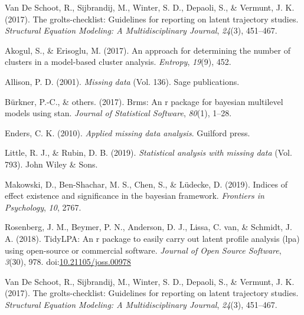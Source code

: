 \documentclass[man]{apa6}
\begin{document}
\leavevmode\hypertarget{ref-van2017grolts}{}%
Van De Schoot, R., Sijbrandij, M., Winter, S. D., Depaoli, S., \& Vermunt, J. K. (2017). The grolts-checklist: Guidelines for reporting on latent trajectory studies. \emph{Structural Equation Modeling: A Multidisciplinary Journal}, \emph{24}(3), 451--467.

\leavevmode\hypertarget{ref-akogul2017approach}{}%
Akogul, S., \& Erisoglu, M. (2017). An approach for determining the number of clusters in a model-based cluster analysis. \emph{Entropy}, \emph{19}(9), 452.

\leavevmode\hypertarget{ref-allison2001missing}{}%
Allison, P. D. (2001). \emph{Missing data} (Vol. 136). Sage publications.

\leavevmode\hypertarget{ref-burkner2017}{}%
Bürkner, P.-C., \& others. (2017). Brms: An r package for bayesian multilevel models using stan. \emph{Journal of Statistical Software}, \emph{80}(1), 1--28.

\leavevmode\hypertarget{ref-enders2010applied}{}%
Enders, C. K. (2010). \emph{Applied missing data analysis}. Guilford press.

\leavevmode\hypertarget{ref-little2019statistical}{}%
Little, R. J., \& Rubin, D. B. (2019). \emph{Statistical analysis with missing data} (Vol. 793). John Wiley \& Sons.

\leavevmode\hypertarget{ref-makowski2019}{}%
Makowski, D., Ben-Shachar, M. S., Chen, S., \& Lüdecke, D. (2019). Indices of effect existence and significance in the bayesian framework. \emph{Frontiers in Psychology}, \emph{10}, 2767.

\leavevmode\hypertarget{ref-R-tidyLPA}{}%
Rosenberg, J. M., Beymer, P. N., Anderson, D. J., Lissa, C. van, \& Schmidt, J. A. (2018). TidyLPA: An r package to easily carry out latent profile analysis (lpa) using open-source or commercial software. \emph{Journal of Open Source Software}, \emph{3}(30), 978. doi:\href{https://doi.org/10.21105/joss.00978}{10.21105/joss.00978}

\leavevmode\hypertarget{ref-van2017grolts}{}%
Van De Schoot, R., Sijbrandij, M., Winter, S. D., Depaoli, S., \& Vermunt, J. K. (2017). The grolts-checklist: Guidelines for reporting on latent trajectory studies. \emph{Structural Equation Modeling: A Multidisciplinary Journal}, \emph{24}(3), 451--467.

\endgroup
\end{document}
